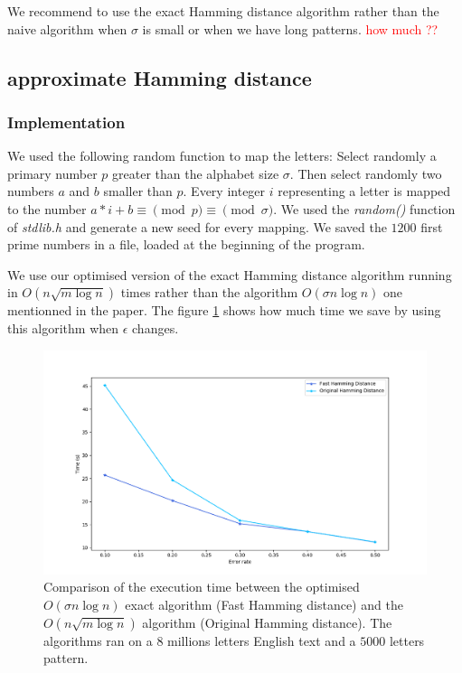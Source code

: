 \documentclass[preprint,12pt]{elsarticle}
\begin{document}
We recommend to use the exact Hamming distance algorithm rather than the naive algorithm
when $\sigma$ is small or when we have long patterns. \textcolor{red}{how much ??}


\subsection{approximate Hamming distance}

\subsubsection*{Implementation}



We used the following random function to map the letters:
Select randomly a primary number $p$ greater than the alphabet size $\sigma$.
Then select randomly two numbers $a$ and $b$ smaller than $p$.
Every integer $i$ representing a letter is mapped to the number
$a * i + b \equiv \pmod p \equiv \pmod \sigma$.
We used the \textit{random()} function of \textit{stdlib.h}
and generate a new seed for every mapping.
We saved the $1200$ first prime numbers in a file, loaded at the beginning of the program.


We use our optimised version of the exact Hamming distance algorithm
running in $O(n \sqrt{m \log n})$ times
rather than the algorithm $O(\sigma n \log n)$ one mentionned in the paper.
The figure \ref{AppHDComp} shows how much time we save by using this algorithm
when $\epsilon$ changes.




\begin{figure}[h]
\includegraphics[scale=0.45]{./figures/appHDCompareNaive.png}
\caption{Comparison of the execution time between the optimised $O(\sigma n \log n)$ exact algorithm
(Fast Hamming distance)
and the $O(n \sqrt{m \log n})$ algorithm (Original Hamming distance).
The algorithms ran on a $8$ millions letters English text and a $5000$ letters pattern.
}
\label{AppHDComp}
\end{figure}
\end{document}
